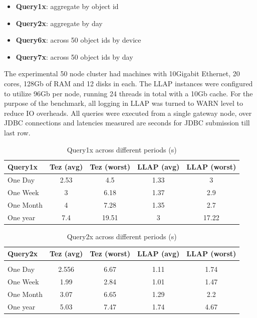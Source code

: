\begin{itemize}
\item \textbf{Query1x}: aggregate by object id
\item \textbf{Query2x}: aggregate by day
\item \textbf{Query6x}: across 50 object ids by device
\item \textbf{Query7x}: across 50 object ids by day
\end{itemize}

The experimental 50 node cluster had machines with 10Gigabit Ethernet, 20 cores, 128Gb of RAM and 12 disks in each. The LLAP instances
were configured to utilize 96Gb per node, running 24 threads in total with a 10Gb cache. For the purpose of the benchmark, all logging
in LLAP was turned to WARN level to reduce IO overheads. All queries were executed from a single gateway node, over JDBC connections 
and latencies measured are seconds for JDBC submission till last row.

\begin{table}[h]
\begin{tabular}{l|*{4}c}
Query1x  &   Tez (avg)  &   Tez (worst)  &   LLAP (avg)  &   LLAP (worst) \\
\hline
One Day  &   2.53  &   4.5  &   1.33  &   3 \\
One Week  &   3  &   6.18  &   1.37  &   2.9 \\
One Month  &   4  &   7.28  &   1.35  &   2.7 \\
One year  &   7.4  &   19.51  &   3  &   17.22 \\
\end{tabular}
\caption{Query1x across different periods (s)}
\end{table}

\begin{table}[h]
\begin{tabular}{l|*{4}c}
Query2x  &   Tez (avg)  &   Tez (worst)  &   LLAP (avg)  &   LLAP (worst) \\
\hline \\
One Day  &   2.556  &   6.67  &   1.11  &   1.74 \\
One Week  &   1.99  &   2.84  &   1.01  &   1.47 \\
One Month  &   3.07  &   6.65  &   1.29  &   2.2 \\
One year  &   5.03  &   7.47  &   1.74  &   4.67 \\
\end{tabular}
\caption{Query2x across different periods (s)}
\end{table}

